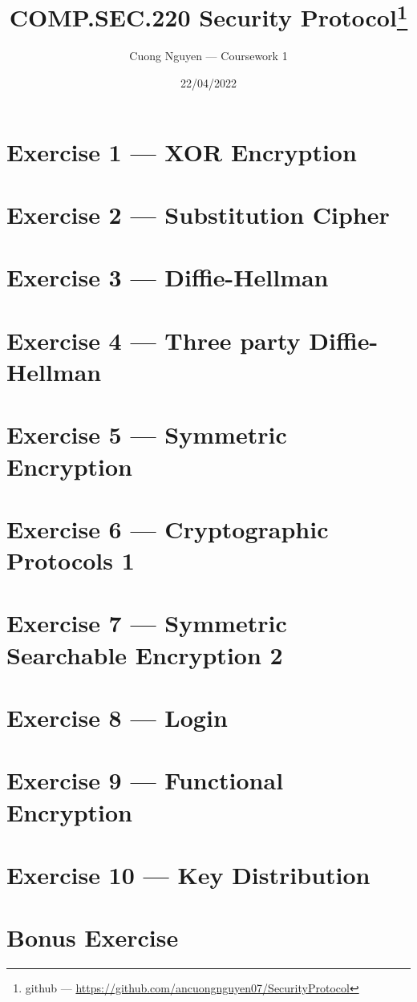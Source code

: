 \documentclass{article}
\title{COMP.SEC.220 Security Protocol\footnote{github --- \url{https://github.com/ancuongnguyen07/SecurityProtocol}}}
\author{Cuong Nguyen --- Coursework 1}
\date{22/04/2022}
\begin{document}
    
\maketitle

\section*{Exercise 1 --- XOR Encryption}
%


\section*{Exercise 2 --- Substitution Cipher}
%

\section*{Exercise 3 --- Diffie-Hellman}
%


\section*{Exercise 4 --- Three party Diffie-Hellman}
%


\section*{Exercise 5 --- Symmetric Encryption}
%


\section*{Exercise 6 --- Cryptographic Protocols 1}
%


\section*{Exercise 7 --- Symmetric Searchable Encryption 2}
%


\section*{Exercise 8 --- Login}
%


\section*{Exercise 9 --- Functional Encryption}
%


\section*{Exercise 10 --- Key Distribution}
%


\section*{Bonus Exercise}
%


\printbibliography
\end{document}
